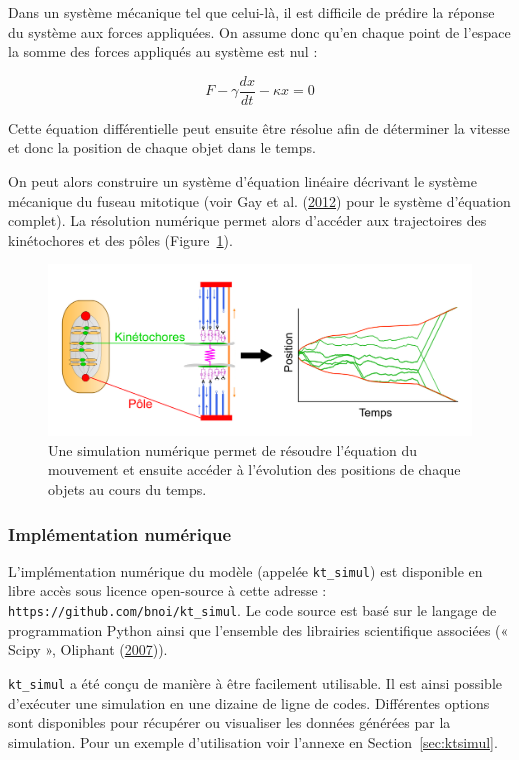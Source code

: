 \documentclass[12pt,a4paper,twoside,openright]{book}
\begin{document}
Dans un système mécanique tel que celui-là, il est difficile de prédire
la réponse du système aux forces appliquées. On assume donc qu'en chaque
point de l'espace la somme des forces appliqués au système est nul :

\[
F - \gamma\frac{dx}{dt} - \kappa x = 0
\]

Cette équation différentielle peut ensuite être résolue afin de
déterminer la vitesse et donc la position de chaque objet dans le temps.

On peut alors construire un système d'équation linéaire décrivant le
système mécanique du fuseau mitotique (voir Gay et al.
(\hyperref[ref-Gay2012a]{2012}) pour le système d'équation complet). La
résolution numérique permet alors d'accéder aux trajectoires des
kinétochores et des pôles (Figure~\ref{fig:traj_model}).

\begin{figure}[htbp]
\centering
\includegraphics{figures/results/modelling/traj_model.png}
\caption[Trajectoire des chromosomes \_in silico\_]{\label{fig:traj_model}Une
simulation numérique permet de résoudre l'équation du mouvement et
ensuite accéder à l'évolution des positions de chaque objets au cours du
temps.}
\end{figure}

\subsubsection{Implémentation
numérique}\label{impluxe9mentation-numuxe9rique}

L'implémentation numérique du modèle (appelée \texttt{kt\_simul}) est
disponible en libre accès sous licence open-source à cette adresse :
\texttt{https://github.com/bnoi/kt\_simul}. Le code source est basé sur
le langage de programmation Python ainsi que l'ensemble des librairies
scientifique associées (« Scipy », Oliphant
(\hyperref[ref-Oliphant2007]{2007})).

\texttt{kt\_simul} a été conçu de manière à être facilement utilisable.
Il est ainsi possible d'exécuter une simulation en une dizaine de ligne
de codes. Différentes options sont disponibles pour récupérer ou
visualiser les données générées par la simulation. Pour un exemple
d'utilisation voir l'annexe en Section~\ref{sec:ktsimul}.
\end{document}

